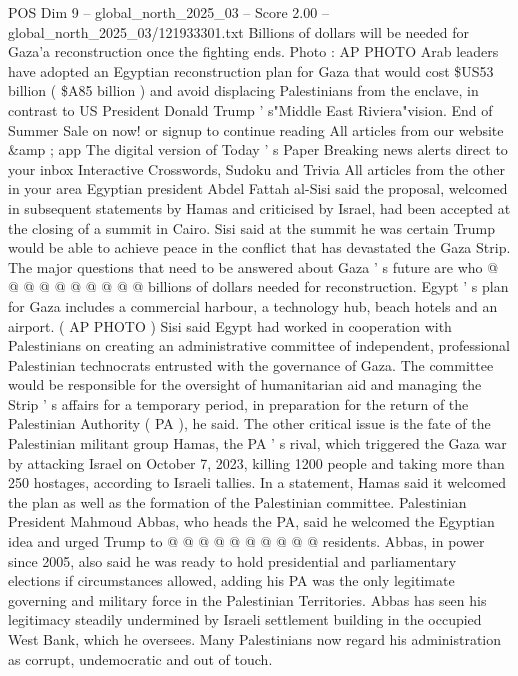 \begin{textsample}{POS Dim 9 – global\_north\_2025\_03 – Score 2.00 – global\_north\_2025\_03/121933301.txt}  \label{ex:f9_pos_298}
Billions of dollars will be needed for Gaza'a reconstruction once the fighting ends.
Photo : AP PHOTO Arab leaders have adopted an Egyptian reconstruction plan for Gaza that would cost \$US53 billion ( \$A85 billion ) and avoid displacing Palestinians from the enclave, in contrast to US President Donald Trump ' s"Middle East Riviera"vision.
End of Summer Sale on now! or signup to continue reading All articles from our website \&amp ; app The digital version of Today ' s Paper Breaking news alerts direct to your inbox Interactive Crosswords, Sudoku and Trivia All articles from the other in your area Egyptian president Abdel Fattah al-Sisi said the proposal, welcomed in subsequent statements by Hamas and criticised by Israel, had been accepted at the closing of a summit in Cairo.
Sisi said at the summit he was certain Trump would be able to achieve peace in the conflict that has devastated the Gaza Strip.
The major questions that need to be answered about Gaza ' s future are who @ @ @ @ @ @ @ @ @ @ billions of dollars needed for reconstruction.
Egypt ' s plan for Gaza includes a commercial harbour, a technology hub, beach hotels and an airport. ( AP PHOTO ) Sisi said Egypt had worked in cooperation with Palestinians on creating an administrative committee of independent, professional Palestinian technocrats entrusted with the governance of Gaza.
The committee would be responsible for the oversight of humanitarian aid and managing the Strip ' s affairs for a temporary period, in preparation for the return of the Palestinian Authority ( PA ), he said.
The other critical issue is the fate of the Palestinian militant group Hamas, the PA ' s rival, which triggered the Gaza war by attacking Israel on October 7, 2023, killing 1200 people and taking more than 250 hostages, according to Israeli tallies.
In a statement, Hamas said it welcomed the plan as well as the formation of the Palestinian committee.
Palestinian President Mahmoud Abbas, who heads the PA, said he welcomed the Egyptian idea and urged Trump to @ @ @ @ @ @ @ @ @ @ residents.
Abbas, in power since 2005, also said he was ready to hold presidential and parliamentary elections if circumstances allowed, adding his PA was the only legitimate governing and military force in the Palestinian Territories.
Abbas has seen his legitimacy steadily undermined by Israeli settlement building in the occupied West Bank, which he oversees.
Many Palestinians now regard his administration as corrupt, undemocratic and out of touch.

\end{textsample}
